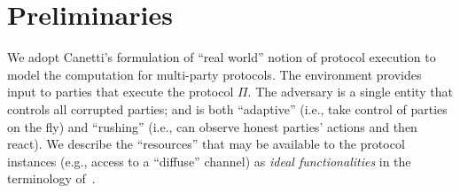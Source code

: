 \section{Preliminaries}
\label{sec:preliminaries}

We adopt Canetti's formulation of ``real world'' notion of protocol execution \cite{JC:Canetti00,EPRINT:Canetti00} to model the computation for multi-party protocols.
%
The environment \Z provides input to parties that execute the protocol $\Pi$.
%
The adversary \adv is a single entity that controls all corrupted parties; and \adv is both ``adaptive'' (i.e., take control of parties on the fly) and ``rushing'' (i.e., \adv can observe honest parties' actions and then react).
%
We describe the ``resources'' that may be available to the protocol instances (e.g., access to a ``diffuse'' channel) as \emph{ideal functionalities} in the terminology of~\cite{EPRINT:Canetti00}.






